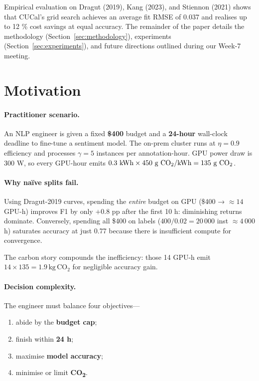 \documentclass[11pt]{article}
\newcommand{\COtwo}{\mathrm{CO_{2}}}  %
\begin{document}
Empirical evaluation on Dragut (2019), Kang (2023), and
Stiennon (2021) shows that CUCal’s grid search achieves an average fit
RMSE of 0.037 and realises up to 12 \% cost savings at equal
accuracy.  
The remainder of the paper details the methodology
(Section~\ref{sec:methodology}), experiments
(Section~\ref{sec:experiments}), and future directions outlined during
our Week-7 meeting.

\section{Motivation}\label{sec:motivation}
\paragraph{Practitioner scenario.}
An NLP engineer is given a fixed \textbf{\$400} budget and a
\textbf{24-hour} wall-clock deadline to fine-tune a sentiment model.
The on-prem cluster runs at
$\eta = 0.9$ efficiency and processes
$\gamma = 5$ instances per annotation-hour.
GPU power draw is 300 W, so every GPU-hour emits
$0.3\text{ kWh}\times 450\text{ g CO\textsubscript{2}/kWh}
 = 135\text{ g CO\textsubscript{2}}$.

\paragraph{Why naïve splits fail.}
Using Dragut-2019 curves, spending the \emph{entire} budget on GPU
(\$400 → $\approx14$ GPU-h) improves F1 by only
$+0.8$ pp after the first 10 h:
diminishing returns dominate.
Conversely, spending all \$400 on labels
($400/0.02 = 20\,000$ inst $\approx4\,000$ h)
saturates accuracy at just 0.77 because there is
insufficient compute for convergence.

The carbon story compounds the inefficiency:
those 14 GPU-h emit
$14\times135 = 1.9\, \text{kg}\,\COtwo$
for negligible accuracy gain.

\paragraph{Decision complexity.}
The engineer must balance four objectives—
\begin{enumerate}
  \item abide by the \textbf{budget cap};
  \item finish within \textbf{24 h};
  \item maximise \textbf{model accuracy};
  \item minimise or limit \textbf{CO\textsubscript{2}}.
\end{enumerate}
\end{document}

